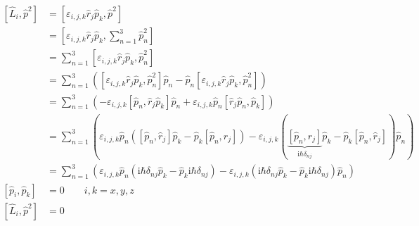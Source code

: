     \begin{align*}
        \left[ \hat{L}_i, \hat{p}^2 \right] &= \left[ \varepsilon_{i,j,k} \hat{r}_j \hat{p}_k, \hat{p}^2 \right]\\
        &= \left[ \varepsilon_{i,j,k} \hat{r}_j \hat{p}_k, \sum_{n=1}^{3} \hat{p}_n^2 \right]\\
        &= \sum_{n=1}^{3} \left[ \varepsilon_{i,j,k} \hat{r}_j \hat{p}_k, \hat{p}_n^2 \right]\\
        &= \sum_{n=1}^{3} \left( \left[ \varepsilon_{i,j,k} \hat{r}_j \hat{p}_k, \hat{p}_n^2 \right] \hat{p}_n - \hat{p}_n \left[ \varepsilon_{i,j,k} \hat{r}_j \hat{p}_k, \hat{p}_n^2 \right] \right)\\
        &= \sum_{n=1}^{3} \left( - \varepsilon_{i,j,k} \left[ \hat{p}_n,\hat{r}_j \hat{p}_k  \right] \hat{p}_n + \varepsilon_{i,j,k} \hat{p}_n \left[ \hat{r}_j \hat{p}_n,\hat{p}_k \right] \right)\\
        &= \sum_{n=1}^{3} \left( \varepsilon_{i,j,k} \hat{p}_n \left( \left[ \hat{p}_n, \hat{r}_j \right] \hat{p}_k - \hat{p}_k \left[ \hat{p}_n, \hat{r}_j \right] \right) 
        - \varepsilon_{i,j,k} \left( \underbrace{\left[ \hat{p}_n, \hat{r}_j \right]}_{\text{i}\hbar \delta_{nj}} \hat{p}_k - \hat{p}_k \left[ \hat{p}_n, \hat{r}_j \right] \right) \hat{p}_n \right)\\
        &= \sum_{n=1}^{3} \left( \varepsilon_{i,j,k} \hat{p}_n \left( \text{i}\hbar \delta_{nj} \hat{p}_k - \hat{p}_k \text{i}\hbar \delta_{nj} \right) 
        - \varepsilon_{i,j,k}  \left( \text{i}\hbar \delta_{nj} \hat{p}_k - \hat{p}_k \text{i}\hbar \delta_{nj} \right) \hat{p}_n \right)\\
        \left[ \hat{p}_i, \hat{p}_k \right] &= 0 \qquad i,k = x,y,z\\
        \left[ \hat{L}_i, \hat{p}^2 \right] &= 0
    \end{align*}





